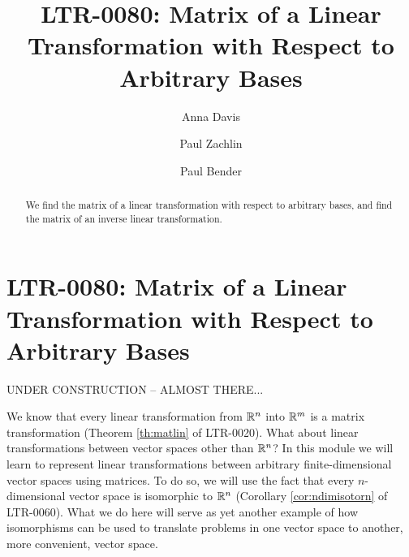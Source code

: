 \documentclass{ximera}
\author{Anna Davis \and Paul Zachlin \and Paul Bender} \title{LTR-0080: Matrix of a Linear Transformation with Respect to Arbitrary Bases} \license{CC-BY 4.0}
\begin{document}
\begin{abstract}
  We find the matrix of a linear transformation with respect to arbitrary bases, and find the matrix of an inverse linear transformation.
\end{abstract}
\maketitle

\section*{LTR-0080: Matrix of a Linear Transformation with Respect to Arbitrary Bases}

\begin{center}

UNDER CONSTRUCTION -- ALMOST THERE...
\end{center}

We know that every linear transformation from $\mathbb{R}^n$ into $\mathbb{R}^m$ is a matrix transformation  (Theorem \ref{th:matlin} of LTR-0020).  What about linear transformations between vector spaces other than $\mathbb{R}^n$?  In this module we will learn to represent linear transformations between arbitrary finite-dimensional vector spaces using matrices.  To do so, we will use the fact that every $n$-dimensional vector space is isomorphic to $\mathbb{R}^n$  (Corollary \ref{cor:ndimisotorn} of LTR-0060).  What we do here will serve as yet another example of how isomorphisms can be used to translate problems in one vector space to another, more convenient, vector space.
\end{document}
